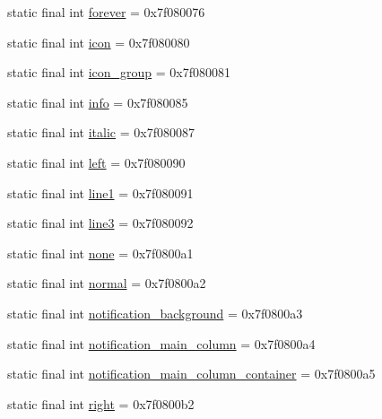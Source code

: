\begin{DoxyCompactItemize}
static final int \mbox{\hyperlink{classandroid_1_1support_1_1fragment_1_1_r_1_1id_a66b5bab8e16306a04b94937007a15d13}{forever}} = 0x7f080076
\item 
static final int \mbox{\hyperlink{classandroid_1_1support_1_1fragment_1_1_r_1_1id_a5140967d824488b19b7e3ddeffbc0c6b}{icon}} = 0x7f080080
\item 
static final int \mbox{\hyperlink{classandroid_1_1support_1_1fragment_1_1_r_1_1id_a93c1918d9c372c21ae60794f6cac296d}{icon\+\_\+group}} = 0x7f080081
\item 
static final int \mbox{\hyperlink{classandroid_1_1support_1_1fragment_1_1_r_1_1id_afebed5e0c4167dc87b4064f20de01931}{info}} = 0x7f080085
\item 
static final int \mbox{\hyperlink{classandroid_1_1support_1_1fragment_1_1_r_1_1id_aeec65cf195be34828b1ce335422650db}{italic}} = 0x7f080087
\item 
static final int \mbox{\hyperlink{classandroid_1_1support_1_1fragment_1_1_r_1_1id_a2b7eed83b3dbdaaed27d285feb20b126}{left}} = 0x7f080090
\item 
static final int \mbox{\hyperlink{classandroid_1_1support_1_1fragment_1_1_r_1_1id_a47bfda58b520f3ab21c3d8ae3c22416d}{line1}} = 0x7f080091
\item 
static final int \mbox{\hyperlink{classandroid_1_1support_1_1fragment_1_1_r_1_1id_a287cdc3b50ba19a14f7fd7ac535f22c8}{line3}} = 0x7f080092
\item 
static final int \mbox{\hyperlink{classandroid_1_1support_1_1fragment_1_1_r_1_1id_ab5d80702f7bd5be78b886703d293bb53}{none}} = 0x7f0800a1
\item 
static final int \mbox{\hyperlink{classandroid_1_1support_1_1fragment_1_1_r_1_1id_a7e6be0bb343837b053b0651abff419f7}{normal}} = 0x7f0800a2
\item 
static final int \mbox{\hyperlink{classandroid_1_1support_1_1fragment_1_1_r_1_1id_a18fa34e0174752772fe13efbc56c9500}{notification\+\_\+background}} = 0x7f0800a3
\item 
static final int \mbox{\hyperlink{classandroid_1_1support_1_1fragment_1_1_r_1_1id_a96fbb522b1122c37fe073a27199a2926}{notification\+\_\+main\+\_\+column}} = 0x7f0800a4
\item 
static final int \mbox{\hyperlink{classandroid_1_1support_1_1fragment_1_1_r_1_1id_ad11dd6bd7529f3257bc7fbca8997f2da}{notification\+\_\+main\+\_\+column\+\_\+container}} = 0x7f0800a5
\item 
static final int \mbox{\hyperlink{classandroid_1_1support_1_1fragment_1_1_r_1_1id_af060f7e6abcb63bfff263a288e8d00c5}{right}} = 0x7f0800b2

\end{DoxyCompactItemize}
